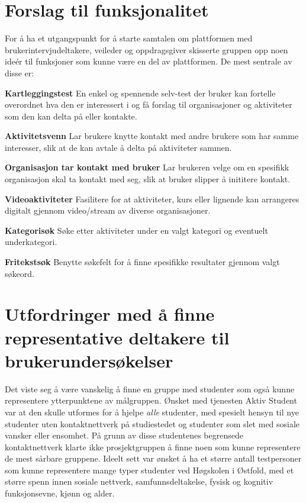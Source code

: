 \section{Forslag til funksjonalitet}
\label{section:funkForslag}
For å ha et utgangspunkt for å starte samtalen om plattformen med brukerintervjudeltakere, veileder og oppdragsgiver skisserte gruppen opp noen ideér til funksjoner som kunne være en del av plattformen. De mest sentrale av disse er:\newline

\begin{compactitem}
\item[{\bf Kartleggingstest}] En enkel og spennende selv-test der bruker kan fortelle overordnet hva den er interessert i og få forslag til organisasjoner og aktiviteter som den kan delta på eller kontakte.
\item[{\bf Aktivitetsvenn}] Lar brukere knytte kontakt med andre brukere som har samme interesser, slik at de kan avtale å delta på aktiviteter sammen.
\item[{\bf Organisasjon tar kontakt med bruker}] Lar brukeren velge om en spesifikk organisasjon skal ta kontakt med seg, slik at bruker slipper å inititere kontakt.
\item[{\bf Videoaktiviteter}] Fasilitere for at aktiviteter, kurs eller lignende kan arrangeres digitalt gjennom video/stream av diverse organisasjoner.
\item[{\bf Kategorisøk}] Søke etter aktiviteter under en valgt kategori og eventuelt underkategori.
\item[{\bf Fritekstsøk}] Benytte søkefelt for å finne spesifikke resultater gjennom valgt søkeord.
\end{compactitem}

\section{Utfordringer med å finne representative deltakere til brukerundersøkelser}

Det viste seg å være vanskelig å finne en gruppe med studenter som også kunne representere ytterpunktene av målgruppen. Ønsket med tjenesten Aktiv Student var at den skulle utformes for å hjelpe {\em alle} studenter, med spesielt hensyn til nye studenter uten kontaktnettverk på studiestedet og studenter som slet med sosiale vansker eller ensomhet. På grunn av disse studentenes begrensede kontaktnettverk klarte ikke prosjektgruppen å finne noen som kunne representere de mest sårbare gruppene. Ideelt sett var ønsket å ha et større antall testpersoner som kunne representere mange typer studenter ved Høgskolen i Østfold, med et større spenn innen sosiale nettverk, samfunnsdeltakelse, fysisk og kognitiv funksjonsevne, kjønn og alder.

